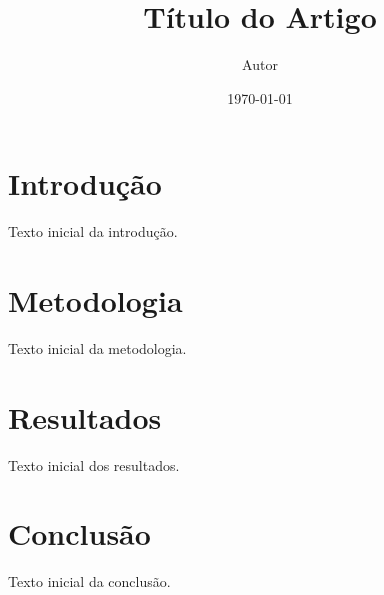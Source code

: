 \documentclass{article}
\title{Título do Artigo}
\author{Autor}
\date{\today}
\begin{document}
\maketitle

\section{Introdução}
Texto inicial da introdução.

\section{Metodologia}
Texto inicial da metodologia.

\section{Resultados}
Texto inicial dos resultados.

\section{Conclusão}
Texto inicial da conclusão.
\end{document}
